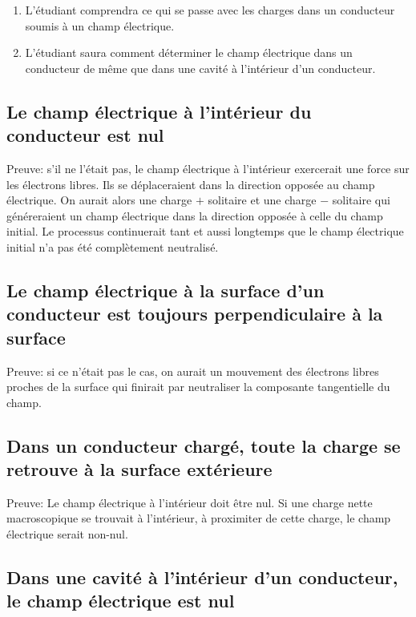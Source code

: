 \begin{enumerate}
  \item L'étudiant comprendra ce qui se passe avec les charges dans un
    conducteur soumis à un champ électrique.
  \item L'étudiant saura comment déterminer le champ électrique dans un
    conducteur de même que dans une cavité à l'intérieur d'un conducteur.
\end{enumerate}


\subsection*{Le champ électrique à l'intérieur du conducteur est nul}

Preuve: s'il ne l'était pas, le champ électrique à l'intérieur exercerait une
force sur les électrons libres. Ils se déplaceraient dans la direction opposée
au champ électrique. On aurait alors une charge $+$ solitaire et une charge $-$
solitaire qui généreraient un champ électrique dans la direction opposée à
celle du champ initial. Le processus continuerait tant et aussi longtemps que
le champ électrique initial n'a pas été complètement neutralisé.



\subsection*{Le champ électrique à la surface d'un conducteur est toujours
  perpendiculaire à la surface}

Preuve: si ce n'était pas le cas, on aurait un mouvement des électrons libres
proches de la surface qui finirait par neutraliser la composante tangentielle
du champ.



\subsection*{Dans un conducteur chargé, toute la charge se retrouve à la surface
  extérieure}

Preuve: Le champ électrique à l'intérieur doit être nul. Si une charge nette
macroscopique se trouvait à l'intérieur, à proximiter de cette charge, le champ
électrique serait non-nul.



\subsection*{Dans une cavité à l'intérieur d'un conducteur, le champ électrique est
  nul}

